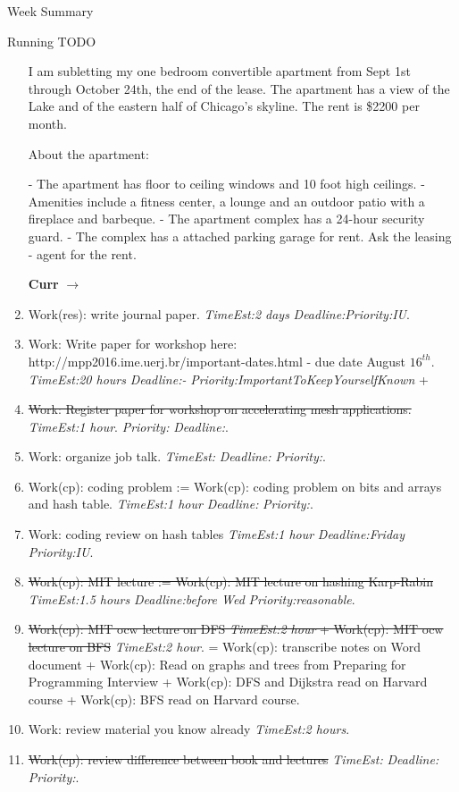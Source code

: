 \documentclass[serif, mathserif, final]{beamer}
\newcommand{\doneTask}[1]{\tiny \item \tiny \sout{#1}}
\newcommand{\te}[1]{\textit{TimeEst:}\textit{#1}}
\newcommand{\dl}[1]{\textit{Deadline:}\textit{#1}}
\newcommand{\pr}[1]{\textit{Priority:}\textit{#1}}
\begin{document}
\begin{frame}
\begin{columns}
\begin{column}{0.5\linewidth}
\begin{block}{Week Summary}
\begin{block}{Running TODO}
\begin{enumerate}
{       I am subletting my one bedroom convertible apartment from Sept
       1st through October 24th, the end of the lease. The apartment has a view of
       the Lake and of the eastern half of Chicago's skyline. The rent is
       \$2200 per month. 

About the apartment: 

- The apartment has floor to ceiling windows and 10 foot high ceilings. 
- Amenities include a fitness center, a lounge and an outdoor patio 
with a fireplace and barbeque.   
- The apartment complex has a 24-hour security guard. 
- The complex has a attached parking garage for rent. Ask the leasing
- agent for the rent.
} 


        \textbf{Curr} $\rightarrow$ 



      \item \tiny Work(res): write journal paper. \te{2 days} \dl{}\pr{IU}.         
      \item \tiny Work: Write paper for workshop here: http://mpp2016.ime.uerj.br/important-dates.html - due date August $16^{th}$.  \te{20 hours} \dl{-}
        \pr{ImportantToKeepYourselfKnown} + \doneTask{Work: Register 
          paper for workshop on accelerating mesh applications.} \te{1
          hour}. \pr{} \dl{}. 

      \item \tiny Work: organize job talk. \te{} \dl{} \pr{}. 

      \item \tiny Work(cp): coding problem := Work(cp): coding problem
        on bits and arrays and hash table.  \te{1 hour} \dl{} \pr{}. 
      \item \tiny Work: coding review on hash tables \te{1 hour} \dl{Friday}
        \pr{IU}. \doneTask{Work(cp): MIT lecture := Work(cp): MIT lecture on
          hashing Karp-Rabin} \te{1.5 hours} \dl{before Wed}
        \pr{reasonable}.

      \doneTask{Work(cp): MIT ocw lecture on DFS \te{2 hour} +
        Work(cp): MIT ocw lecture on BFS}  \te{2 hour}.
        = Work(cp): transcribe notes on Word document 
        + Work(cp): Read on graphs and trees from Preparing for Programming Interview 
        + Work(cp): DFS and Dijkstra read on Harvard course 
        + Work(cp): BFS read on Harvard course. 

      \item \tiny Work: review material you know already \te{2 hours}. 
        \doneTask{Work(cp): review difference between book and
          lectures} \te{} \dl{} \pr{}. 


\end{enumerate}
\end{block}
\end{block}
\end{column}
\end{columns}
\end{frame}
\end{document}
